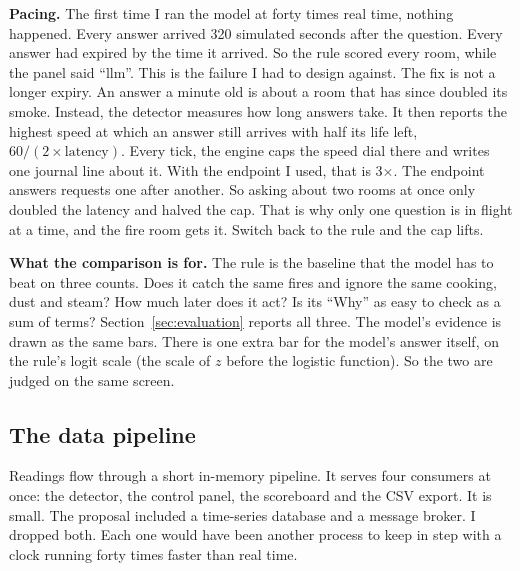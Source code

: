 \textbf{Pacing.} The first time I ran the model at forty times real time, nothing
happened. Every answer arrived 320 simulated seconds after the question. Every
answer had expired by the time it arrived. So the rule scored every room, while the
panel said ``llm''. This is the failure I had to design against. The fix is not a
longer expiry. An answer a minute old is about a room that has since doubled its
smoke. Instead, the detector measures how long answers take. It then reports the
highest speed at which an answer still arrives with half its life left,
$60 / (2 \times \text{latency})$. Every tick, the engine caps the speed dial there
and writes one journal line about it. With the endpoint I used, that is 3$\times$.
The endpoint answers requests one after another. So asking about two rooms at once
only doubled the latency and halved the cap. That is why only one question is in
flight at a time, and the fire room gets it. Switch back to the rule and the cap
lifts.

\textbf{What the comparison is for.} The rule is the baseline that the model has
to beat on three counts. Does it catch the same fires and ignore the same cooking,
dust and steam? How much later does it act? Is its ``Why'' as easy to check as a
sum of terms? Section~\ref{sec:evaluation} reports all three. The model's evidence is drawn as the
same bars. There is one extra bar for the model's answer itself, on the rule's
logit scale (the scale of $z$ before the logistic function). So the two are judged
on the same screen.

\subsection{The data pipeline}\label{sec:pipeline}

Readings flow through a short in-memory pipeline. It serves four consumers at once:
the detector, the control panel, the scoreboard and the CSV export. It is small.
The proposal included a time-series database and a message broker. I dropped both.
Each one would have been another process to keep in step with a clock running
forty times faster than real time.

